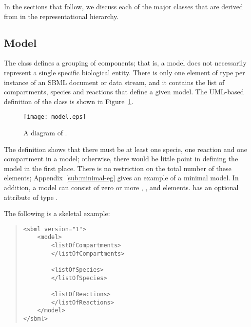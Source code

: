 \documentclass[10pt]{cek-article}
\begin{document}
In the sections that follow, we discuss each of the major classes
that are derived from  in the representational
hierarchy.


\subsection{Model}

The  class defines a grouping of components; that is, a model
does not necessarily represent a single specific biological entity.  There
is only one element of type  per instance of an SBML document
or data stream, and it contains the list of compartments, species and
reactions that define a given model.  The UML-based definition of the class
is shown in Figure~\ref{fig:model}.

\begin{figure}[htb]
  \centering
  \texttt{[image: model.eps]}
  \caption{A diagram of .}
  \label{fig:model}
\end{figure}

\newpage

The definition shows that there must be at least one specie, one reaction
and one compartment in a model; otherwise, there would be little point in
defining the model in the first place.  There is no restriction on the
total number of these elements; Appendix~\ref{sub:minimal-eg} gives an
example of a minimal model.  In addition, a model can consist of zero or
more , ,  and 
elements.   has an optional  attribute of type .

The following is a skeletal example:
\begin{quote}
\begin{small}
\tightspacing
\begin{verbatim}
<sbml version="1">
    <model>
        <listOfCompartments>
        </listOfCompartments>

        <listOfSpecies>
        </listOfSpecies>

        <listOfReactions>
        </listOfReactions>
    </model>
</sbml>
\end{verbatim}
\regularspacing
\end{small}
\end{quote}
\end{document}
